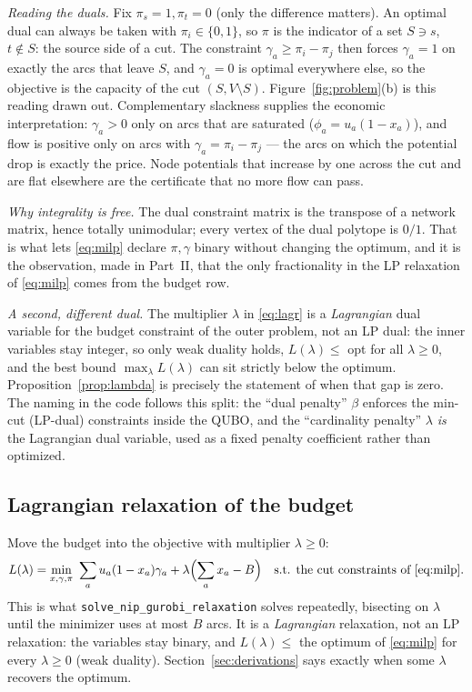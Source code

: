 \documentclass[11pt]{article}
\newcommand{\code}[1]{\texttt{#1}}
\begin{document}
\emph{Reading the duals.} Fix $\pi_s = 1, \pi_t = 0$ (only the difference matters). An optimal dual can always be taken with $\pi_i \in \{0,1\}$, so $\pi$ is the indicator of a set $S \ni s$, $t \notin S$: the source side of a cut. The constraint $\gamma_a \ge \pi_i - \pi_j$ then forces $\gamma_a = 1$ on exactly the arcs that leave $S$, and $\gamma_a = 0$ is optimal everywhere else, so the objective is the capacity of the cut $(S, V\setminus S)$. Figure~\ref{fig:problem}(b) is this reading drawn out. Complementary slackness supplies the economic interpretation: $\gamma_a > 0$ only on arcs that are saturated ($\phi_a = u_a(1-x_a)$), and flow is positive only on arcs with $\gamma_a = \pi_i - \pi_j$ --- the arcs on which the potential drop is exactly the price. Node potentials that increase by one across the cut and are flat elsewhere are the certificate that no more flow can pass.

\emph{Why integrality is free.} The dual constraint matrix is the transpose of a network matrix, hence totally unimodular; every vertex of the dual polytope is $0/1$. That is what lets \eqref{eq:milp} declare $\pi,\gamma$ binary without changing the optimum, and it is the observation, made in Part~II, that the only fractionality in the LP relaxation of \eqref{eq:milp} comes from the budget row.

\emph{A second, different dual.} The multiplier $\lambda$ in \eqref{eq:lagr} is a \emph{Lagrangian} dual variable for the budget constraint of the outer problem, not an LP dual: the inner variables stay integer, so only weak duality holds, $L(\lambda) \le$ opt for all $\lambda \ge 0$, and the best bound $\max_\lambda L(\lambda)$ can sit strictly below the optimum. Proposition~\ref{prop:lambda} is precisely the statement of when that gap is zero. The naming in the code follows this split: the ``dual penalty'' $\beta$ enforces the min-cut (LP-dual) constraints inside the QUBO, and the ``cardinality penalty'' $\lambda$ \emph{is} the Lagrangian dual variable, used as a fixed penalty coefficient rather than optimized.

\subsection{Lagrangian relaxation of the budget}

Move the budget into the objective with multiplier $\lambda \ge 0$:
\begin{equation}
\label{eq:lagr}
L(\lambda) = \min_{x,\gamma,\pi}\ \sum_a u_a(1-x_a)\gamma_a + \lambda\Bigl(\sum_a x_a - B\Bigr)\quad\text{s.t. the cut constraints of \eqref{eq:milp}}.
\end{equation}
This is what \code{solve\_nip\_gurobi\_relaxation} solves repeatedly, bisecting on $\lambda$ until the minimizer uses at most $B$ arcs. It is a \emph{Lagrangian} relaxation, not an LP relaxation: the variables stay binary, and $L(\lambda) \le$ the optimum of \eqref{eq:milp} for every $\lambda \ge 0$ (weak duality). Section~\ref{sec:derivations} says exactly when some $\lambda$ recovers the optimum.
\end{document}
